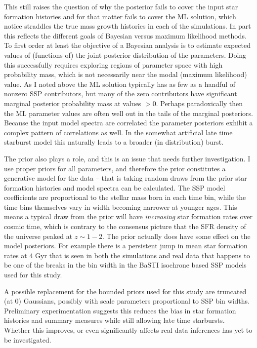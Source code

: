 \documentclass[modern]{aastex62}
\begin{document}
This still raises the question of why the posterior fails to cover the input star formation histories and for that matter fails to cover the ML solution, which notice straddles the true mass growth histories in each of the simulations. In part this reflects the different goals of Bayesian versus maximum likelihood methods. To first order at least the objective of a Bayesian analysis is to estimate expected values of (functions of) the joint posterior distribution of the parameters. Doing this successfully requires exploring regions of parameter space with high probability mass, which is not necessarily near the modal (maximum likelihood) value. As I noted above the ML solution typically has as few as a handful of nonzero SSP contributors, but many of the zero contributors have significant marginal posterior probability mass at values $> 0$. Perhaps paradoxically then the ML parameter values are often well out in the tails of the marginal posteriors. Because the input model spectra are correlated the parameter posteriors exhibit a complex pattern of correlations as well. In the somewhat artificial late time starburst model this naturally leads to a broader (in distribution) burst.

The prior also plays a role, and this is an issue that needs further investigation. I use proper priors for all parameters, and therefore the prior constitutes a generative model for the data -- that is taking random draws from the prior star formation histories and model spectra can be calculated. The SSP model coefficients are proportional to the stellar mass born in each time bin, while the time bins themselves vary in width becoming narrower at younger ages. This means a typical draw from the prior will have \emph{increasing} star formation rates over cosmic time, which is contrary to the consensus picture that the SFR density of the universe peaked at $z \sim 1-2$. The prior actually does have some effect on the model posteriors. For example there is a persistent jump in mean star formation rates at 4 Gyr that is seen in both the simulations and real data that happens to be one of the breaks in the bin width in the BaSTI isochrone based SSP models used for this study.

A possible replacement for the bounded priors used for this study are truncated (at 0) Gaussians, possibly with scale parameters proportional to SSP bin widths. Preliminary experimentation suggests this reduces the bias in star formation histories and summary measures while still allowing late time starbursts. Whether this improves, or even significantly affects real data inferences has yet to be investigated.
\end{document}

